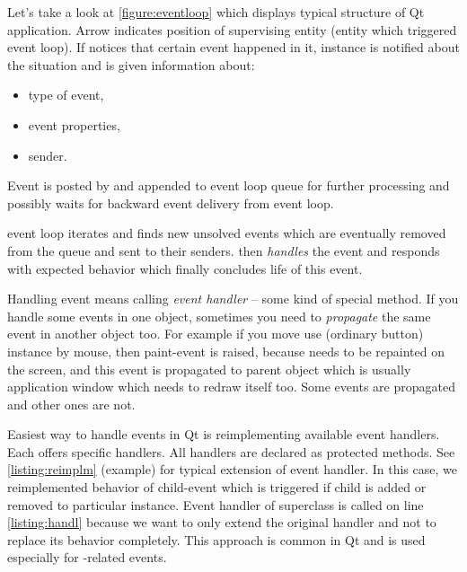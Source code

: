 Let's take a look at \autoref{figure:eventloop} which displays typical structure of Qt application.  Arrow indicates position of supervising entity (entity which triggered event loop). If notices that certain event happened in it, instance is notified about the situation and is given information about:
\begin{itemize}
\item type of event,
\item event properties,
\item sender.
\end{itemize}
Event is posted by and appended to event loop queue for further processing and possibly waits for backward event delivery from event loop.

\indent{} event loop iterates and finds new unsolved events which are eventually removed from the queue and sent to their senders. then \textit{handles} the event and responds with expected behavior which finally concludes life of this event.

Handling event means calling \textit{event handler} -- some kind of special method. If you handle some events in one object, sometimes you need to \textit{propagate} the same event in another object too. For example if you move use (ordinary button) instance by mouse, then paint-event is raised, because needs to be repainted on the screen, and this event is propagated to parent object which is usually application window which needs to redraw itself too. Some events are propagated and other ones are not.

Easiest way to handle events in Qt is reimplementing available event handlers. Each offers specific handlers. All handlers are declared as protected methods. See \autoref{listing:reimplm} (example) for typical extension of event handler. In this case, we reimplemented behavior of child-event which is triggered if child is added or removed to particular instance. Event handler of superclass is called on line \ref{listing:handl} because we want to only extend the original handler and not to replace its behavior completely. This approach is common in Qt and is used especially for -related events.

